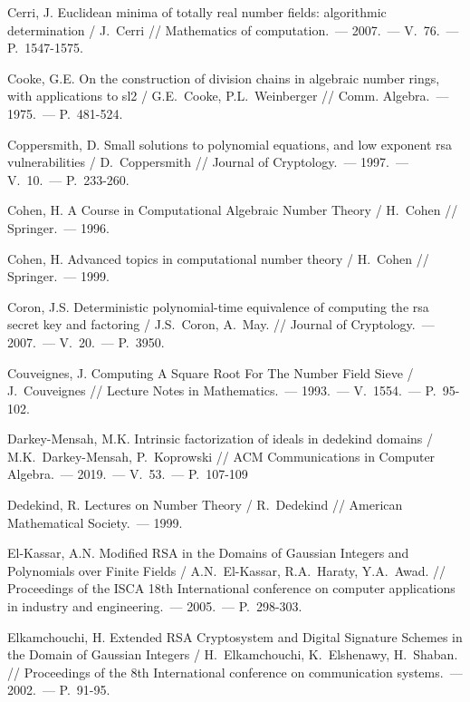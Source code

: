 \documentclass[_00_dissertation.tex]{subfiles}
\begin{document}
\begin{thebibliography}{99}
    Cerri, J. Euclidean minima of totally real number fields: algorithmic determination / J.~Cerri // Mathematics of computation.~--- 2007.~--- V.~76.~--- P.~1547-1575.

    Cooke, G.E. On the construction of division chains in algebraic number rings, with applications to sl2 / G.E.~Cooke, P.L.~Weinberger // Comm. Algebra.~--- 1975.~--- P.~481-524.

    Coppersmith, D. Small solutions to polynomial equations, and low exponent rsa vulnerabilities / D.~Coppersmith // Journal of Cryptology.~--- 1997.~--- V.~10.~--- P.~233-260.

    Cohen, H. A Course in Computational Algebraic Number Theory / H.~Cohen // Springer.~--- 1996.

    Cohen, H. Advanced topics in computational number theory / H.~Cohen // Springer.~--- 1999.

    Coron, J.S. Deterministic polynomial-time equivalence of computing the rsa secret key and factoring / J.S.~Coron, A.~May. // Journal of Cryptology.~--- 2007.~--- V.~20.~--- P.~3950.

    Couveignes, J. Computing A Square Root For The Number Field Sieve / J.~Couveignes // Lecture Notes in Mathematics.~--- 1993.~--- V.~1554.~--- P.~95-102.

    Darkey-Mensah, M.K. Intrinsic factorization of ideals in dedekind domains / M.K.~Darkey-Mensah, P.~Koprowski // ACM Communications in Computer Algebra.~--- 2019.~--- V.~53.~--- P.~107-109

    Dedekind, R. Lectures on Number Theory / R.~Dedekind // American Mathematical Society.~--- 1999.

    El-Kassar, A.N. Modified RSA in the Domains of Gaussian Integers and Polynomials over Finite Fields / A.N.~El-Kassar, R.A.~Haraty, Y.A.~Awad. // Proceedings of the ISCA 18th International conference on computer applications in industry and engineering.~--- 2005.~--- P.~298-303.

    Elkamchouchi, H. Extended RSA Cryptosystem and Digital Signature Schemes in the Domain of Gaussian Integers / H.~Elkamchouchi, K.~Elshenawy, H.~Shaban. // Proceedings of the 8th International conference on communication systems.~--- 2002.~--- P.~91-95.


\end{thebibliography}
\end{document}
